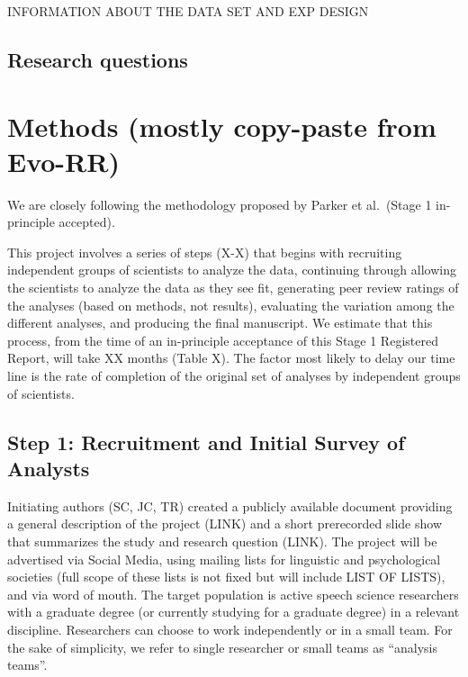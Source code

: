 \documentclass[
  english,
  man]{apa6}
\begin{document}
INFORMATION ABOUT THE DATA SET AND EXP DESIGN

\hypertarget{research-questions}{%
\subsection{Research questions}\label{research-questions}}

\hypertarget{methods-mostly-copy-paste-from-evo-rr}{%
\section{Methods (mostly copy-paste from Evo-RR)}\label{methods-mostly-copy-paste-from-evo-rr}}

We are closely following the methodology proposed by Parker et al.~(Stage 1 in-principle accepted).

This project involves a series of steps (X-X) that begins with recruiting independent groups of scientists to analyze the data, continuing through allowing the scientists to analyze the data as they see fit, generating peer review ratings of the analyses (based on methods, not results), evaluating the variation among the different analyses, and producing the final manuscript.
We estimate that this process, from the time of an in-principle acceptance of this Stage 1 Registered Report, will take XX months (Table X).
The factor most likely to delay our time line is the rate of completion of the original set of analyses by independent groups of scientists.

\hypertarget{step-1-recruitment-and-initial-survey-of-analysts}{%
\subsection{Step 1: Recruitment and Initial Survey of Analysts}\label{step-1-recruitment-and-initial-survey-of-analysts}}

Initiating authors (SC, JC, TR) created a publicly available document providing a general description of the project (LINK) and a short prerecorded slide show that summarizes the study and research question (LINK).
The project will be advertised via Social Media, using mailing lists for linguistic and psychological societies (full scope of these lists is not fixed but will include LIST OF LISTS), and via word of mouth.
The target population is active speech science researchers with a graduate degree (or currently studying for a graduate degree) in a relevant discipline.
Researchers can choose to work independently or in a small team.
For the sake of simplicity, we refer to single researcher or small teams as \enquote{analysis teams}.
\end{document}
